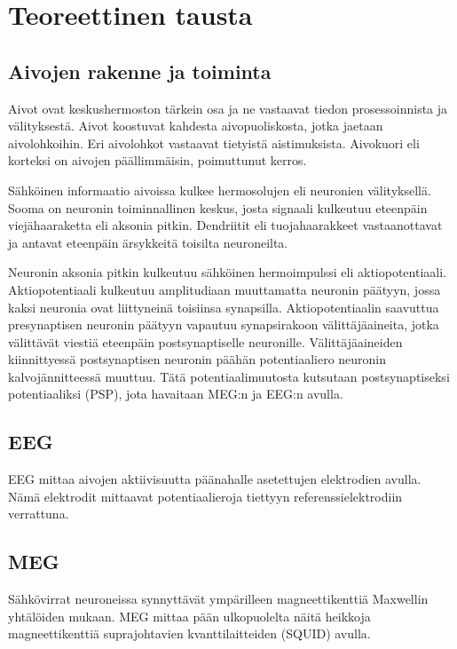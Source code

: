 \section{Teoreettinen tausta}

\subsection{Aivojen rakenne ja toiminta}
Aivot ovat keskushermoston tärkein osa ja ne vastaavat tiedon prosessoinnista ja välityksestä. Aivot koostuvat kahdesta aivopuoliskosta, jotka jaetaan aivolohkoihin. Eri aivolohkot vastaavat tietyistä aistimuksista. Aivokuori eli korteksi on aivojen päällimmäisin, poimuttunut kerros. \citep{Hamalainen1993MagnetoencephalographytheoryBrain}

Sähköinen informaatio aivoissa kulkee hermosolujen eli neuronien välityksellä. Sooma on neuronin toiminnallinen keskus, josta signaali kulkeutuu eteenpäin viejähaaraketta eli aksonia pitkin. Dendriitit eli tuojahaarakkeet vastaanottavat ja antavat eteenpäin ärsykkeitä toisilta neuroneilta. \citep{Hamalainen1993MagnetoencephalographytheoryBrain}

Neuronin aksonia pitkin kulkeutuu sähköinen hermoimpulssi eli aktiopotentiaali. Aktiopotentiaali kulkeutuu amplitudiaan muuttamatta neuronin päätyyn, jossa kaksi neuronia ovat liittyneinä toisiinsa synapsilla. Aktiopotentiaalin saavuttua presynaptisen neuronin päätyyn vapautuu synapsirakoon välittäjäaineita, jotka välittävät viestiä eteenpäin postsynaptiselle neuronille. Välittäjäaineiden kiinnittyessä postsynaptisen neuronin päähän potentiaaliero neuronin kalvojännitteessä muuttuu. Tätä potentiaalimuutosta kutsutaan postsynaptiseksi potentiaaliksi (PSP), jota havaitaan MEG:n ja EEG:n avulla. \citep{Hamalainen1993MagnetoencephalographytheoryBrain}

\subsection{EEG}
EEG mittaa aivojen aktiivisuutta päänahalle asetettujen elektrodien avulla. Nämä elektrodit mittaavat potentiaalieroja tiettyyn referenssielektrodiin verrattuna. \citep{niedermeyer2011niedermeyer}

\subsection{MEG}
Sähkövirrat neuroneissa synnyttävät ympärilleen magneettikenttiä Maxwellin yhtälöiden mukaan. MEG mittaa pään ulkopuolelta näitä heikkoja magneettikenttiä suprajohtavien kvanttilaitteiden (SQUID) avulla.

